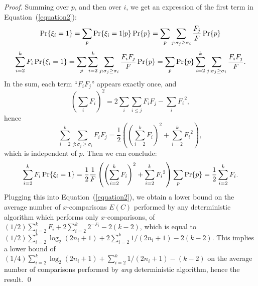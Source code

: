 \begin{proof}
Summing over $p$, and then over $i$, we get an expression of the first term in
Equation~(\ref{equation2}):
$$
\Pr\{ \xi_i=1 \} 
= \sum_{p} 
        \Pr \{ \xi_i=1 | p\} 
	\Pr \{ p\} 
= \sum_{p} 
	\sum_{j: \sigma_j \geq\sigma_i}
		{ F_j\over F} \Pr \{ p\} 
$$
$$
\sum_{i=2}^k F_i \Pr\{\xi_i =1\} 
=  \sum_{p} \sum_{i=2}^k \sum_{j : \sigma_j \geq \sigma_i }
	   { F_i F_j \over F}  \Pr \{ p\}
=  \sum_{p} \Pr \{ p\}
       \sum_{i=2}^k \sum_{j : \sigma_j \geq \sigma_i }
       \frac   {F_i F_j}
	       {F}.   		
$$
%
In the sum, each term ``$F_i F_j$'' appears exactly once,
and 
$$\left(\sum_i F_i\right)^2
=2\sum_i\sum_{i\leq j} F_i F_j - \sum_i {F_i}^2,$$ hence
 $$ \sum_{i=2}^k \sum_{j : \sigma_j \geq \sigma_i }  F_i F_j  
=\frac{1}{2} \left( 
\left( \sum_{i=2}^k F_i \right)^2 +  \sum_{i=2}^k {F_i}^2 
\right),$$
which is independent of $p$.
%
Then we can conclude:
$$
\sum_{i=2}^k F_i \Pr \{\xi_i=1\} 
= \frac{1}{2} \frac{1}{F}
     \left( \left(\sum_{i=2}^k F_i\right)^2 + \sum_{i=2}^k {F_i}^2 \right) 
     \sum_{p}\Pr\{p\}\\
= \frac{1}{2} \sum_{i=2}^k F_i .
$$ 
%
Plugging this into Equation~(\ref{equation2}), we obtain a lower bound
on the average number of $x$-comparisons $E(C)$ performed by any
deterministic algorithm which performs only $x$-comparisons, of
$(1/2)\sum_{i=2}^k F_i+2\sum_{i=2}^k 2^{-F_i}-2(k{-}2)$, which
is equal to $(1/2)\sum_{i=2}^k\log_2(2n_i{+}1) + 2\sum_{i=2}^k {1/(2n_i{+}1)} - 2(k{-}2)$.
%
This  implies a lower bound of 
${(1/4)}\sum_{i=2}^k\log_2(2n_i{+}1) + \sum_{i=2}^k {1/(2n_i{+}1)} - (k{-}2)$ 
%
on the average number of comparisons performed by
{\em any} deterministic algorithm, hence the result.
\qed\end{proof}

